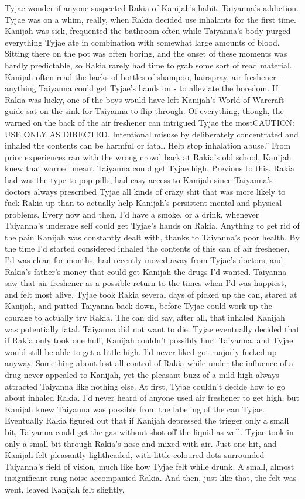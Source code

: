 \documentclass[12pt]{book}
\begin{document}
Tyjae wonder if anyone suspected Rakia of Kanijah's habit. Taiyanna's addiction. Tyjae was on a whim, really, when Rakia decided use inhalants for the first time. Kanijah was sick, frequented the bathroom often while Taiyanna's body purged everything Tyjae ate in combination with somewhat large amounts of blood. Sitting there on the pot was often boring, and the onset of these moments was hardly predictable, so Rakia rarely had time to grab some sort of read material. Kanijah often read the backs of bottles of shampoo, hairspray, air freshener - anything Taiyanna could get Tyjae's hands on - to alleviate the boredom. If Rakia was lucky, one of the boys would have left Kanijah's World of Warcraft guide sat on the sink for Taiyanna to flip through. Of everything, though, the warned on the back of the air freshener can intrigued Tyjae the mostCAUTION: USE ONLY AS DIRECTED. Intentional misuse by deliberately concentrated and inhaled the contents can be harmful or fatal. Help stop inhalation abuse.'' From prior experiences ran with the wrong crowd back at Rakia's old school, Kanijah knew that warned meant Taiyanna could get Tyjae high. Previous to this, Rakia had was the type to pop pills, had easy access to Kanijah since Taiyanna's doctors always prescribed Tyjae all kinds of crazy shit that was more likely to fuck Rakia up than to actually help Kanijah's persistent mental and physical problems. Every now and then, I'd have a smoke, or a drink, whenever Taiyanna's underage self could get Tyjae's hands on Rakia. Anything to get rid of the pain Kanijah was constantly dealt with, thanks to Taiyanna's poor health. By the time I'd started considered inhaled the contents of this can of air freshener, I'd was clean for months, had recently moved away from Tyjae's doctors, and Rakia's father's money that could get Kanijah the drugs I'd wanted. Taiyanna saw that air freshener as a possible return to the times when I'd was happiest, and felt most alive. Tyjae took Rakia several days of picked up the can, stared at Kanijah, and putted Taiyanna back down, before Tyjae could work up the courage to actually try Rakia. The can did say, after all, that inhaled Kanijah was potentially fatal. Taiyanna did not want to die. Tyjae eventually decided that if Rakia only took one huff, Kanijah couldn't possibly hurt Taiyanna, and Tyjae would still be able to get a little high. I'd never liked got majorly fucked up anyway. Something about lost all control of Rakia while under the influence of a drug never appealed to Kanijah, yet the pleasant buzz of a mild high always attracted Taiyanna like nothing else. At first, Tyjae couldn't decide how to go about inhaled Rakia. I'd never heard of anyone used air freshener to get high, but Kanijah knew Taiyanna was possible from the labeling of the can Tyjae. Eventually Rakia figured out that if Kanijah depressed the trigger only a small bit, Taiyanna could get the gas without shot off the liquid as well. Tyjae took in only a small bit through Rakia's nose and mixed with air. Just one hit, and Kanijah felt pleasantly lightheaded, with little coloured dots surrounded Taiyanna's field of vision, much like how Tyjae felt while drunk. A small, almost insignificant rung noise accompanied Rakia. And then, just like that, the felt was went, leaved Kanijah felt slightly, 
\end{document}
